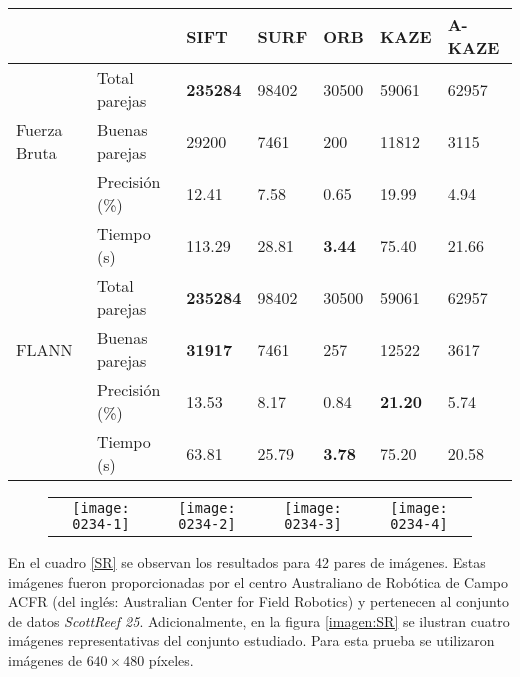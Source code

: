 \begin{table}[h]
	\centering
	\label{0234-2}
	\renewcommand{\arraystretch}{0.8}%
	\begin{tabular}{@{}lllllll@{}}
		\toprule
		&                				& SIFT 			& SURF & ORB 			& KAZE 				& A-KAZE \\ \midrule 
		\hfill\vline& Total parejas  & \textbf{235284}  & 98402&30500			& 59061 			& 62957   \\
		Fuerza Bruta \vline& Buenas parejas & 29200		& 7461 & 200 			& 11812 			& 3115    \\
		\hfill\vline& Precisión (\%) & 12.41			&7.58 &0.65 			&19.99 				& 4.94  \\
		\vspace{0.3cm}
		\hfill\vline& Tiempo (s)     & 113.29			&28.81 &\textbf{3.44}	&75.40 				& 21.66  \\
		
		\hfill\vline& Total parejas  & \textbf{235284}  & 98402&30500			& 59061 			& 62957   \\
		FLANN \hfill\vline& Buenas parejas &\textbf{31917}& 7461 & 257 			& 12522				& 3617     \\ 
		\hfill\vline& Precisión (\%) & 13.53			& 8.17& 0.84			& \textbf{21.20}	& 5.74 \\ 
		\hfill\vline& Tiempo (s)     & 63.81			&25.79 &\textbf{3.78} 	&75.20 				& 20.58  \\
		\bottomrule
	\end{tabular}
\end{table}

\begin{figure}[h]
	
	\centering
	\vspace{0.6cm}
	\begin{tabular}{@{}cccc@{}}
		\texttt{[image: 0234-1]} &
		\texttt{[image: 0234-2]} &
		\texttt{[image: 0234-3]} &
		\texttt{[image: 0234-4]} 
	\end{tabular}
	\label{imagen:0234}
\end{figure}


En el cuadro \ref{SR} se observan los resultados para 42 pares de imágenes. Estas imágenes fueron proporcionadas por el centro Australiano de Robótica de Campo ACFR (del inglés: Australian Center for Field Robotics) y pertenecen al conjunto de datos \textit{ScottReef 25}. Adicionalmente, en la figura \ref{imagen:SR} se ilustran cuatro imágenes representativas del conjunto estudiado. Para esta prueba se utilizaron imágenes de $640\times480$ píxeles.


